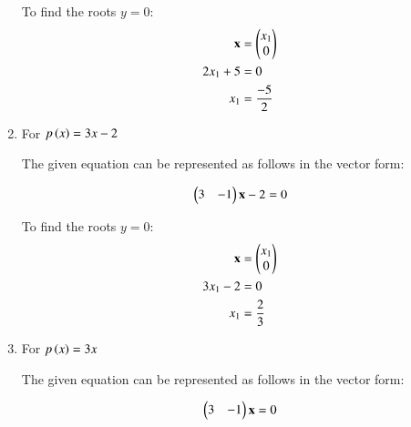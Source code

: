 \begin{enumerate}
To find the roots $y=0$:
\begin{align}
\mathbf{x} &= \begin{pmatrix}x_1\\0\end{pmatrix} \\
2x_1 + 5 &= 0 \\
x_1 &= \frac{-5}{2}
\end{align}

\item \solution For $p\left(x\right) = 3x - 2$
\begin{flushleft}
The given equation can be represented as follows in the vector form:
\end{flushleft}
\begin{align}
\begin{pmatrix}
3 & -1 
\end{pmatrix}
\mathbf{x} - 2 = 0
\end{align}

To find the roots $y=0$:
\begin{align}
\mathbf{x} &= \begin{pmatrix}x_1\\0\end{pmatrix} \\
3x_1 - 2 &= 0 \\
x_1 &= \frac{2}{3}
\end{align}
\item 
\solution For $p\left(x\right) = 3x$
\begin{flushleft}
The given equation can be represented as follows in the vector form:
\end{flushleft}
\begin{align}
\begin{pmatrix}
3 & -1 
\end{pmatrix}
\mathbf{x}  = 0
\end{align}


\end{enumerate}
